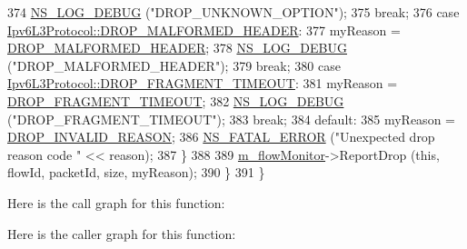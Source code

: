 \begin{DoxyCode}
374            \hyperlink{group__logging_ga413f1886406d49f59a6a0a89b77b4d0a}{NS\_LOG\_DEBUG} (\textcolor{stringliteral}{"DROP\_UNKNOWN\_OPTION"});
375            \textcolor{keywordflow}{break};
376         \textcolor{keywordflow}{case} \hyperlink{classns3_1_1Ipv6L3Protocol_a33c64db9bc35f71ff368b132bfffa37aaddfae41b279341b99d46df16e0d4ea7b}{Ipv6L3Protocol::DROP\_MALFORMED\_HEADER}:
377            myReason = \hyperlink{classns3_1_1Ipv6FlowProbe_ac81e6b10f93e4d47d440d1df59b1e6b1ad8bfe81a88e289897ff7e7f0174a9115}{DROP\_MALFORMED\_HEADER};
378            \hyperlink{group__logging_ga413f1886406d49f59a6a0a89b77b4d0a}{NS\_LOG\_DEBUG} (\textcolor{stringliteral}{"DROP\_MALFORMED\_HEADER"});
379            \textcolor{keywordflow}{break};
380         \textcolor{keywordflow}{case} \hyperlink{classns3_1_1Ipv6L3Protocol_a33c64db9bc35f71ff368b132bfffa37aa27ee7f562d7201ffd26f3e08bf620d0a}{Ipv6L3Protocol::DROP\_FRAGMENT\_TIMEOUT}:
381           myReason = \hyperlink{classns3_1_1Ipv6FlowProbe_ac81e6b10f93e4d47d440d1df59b1e6b1a00de0a9a89297e0c488dcbe4d20dff07}{DROP\_FRAGMENT\_TIMEOUT};
382           \hyperlink{group__logging_ga413f1886406d49f59a6a0a89b77b4d0a}{NS\_LOG\_DEBUG} (\textcolor{stringliteral}{"DROP\_FRAGMENT\_TIMEOUT"});
383           \textcolor{keywordflow}{break};
384         \textcolor{keywordflow}{default}:
385           myReason = \hyperlink{classns3_1_1Ipv6FlowProbe_ac81e6b10f93e4d47d440d1df59b1e6b1ae3c85c65b692d59f9ee6d140bf14d78f}{DROP\_INVALID\_REASON};
386           \hyperlink{group__fatal_ga5131d5e3f75d7d4cbfd706ac456fdc85}{NS\_FATAL\_ERROR} (\textcolor{stringliteral}{"Unexpected drop reason code "} << reason);
387         \}
388 
389       \hyperlink{classns3_1_1FlowProbe_adab205c7ab7cf4c65d72d030d8aaa82a}{m\_flowMonitor}->ReportDrop (\textcolor{keyword}{this}, flowId, packetId, size, myReason);
390     \}
391 \}
\end{DoxyCode}


Here is the call graph for this function\+:




Here is the caller graph for this function\+:


